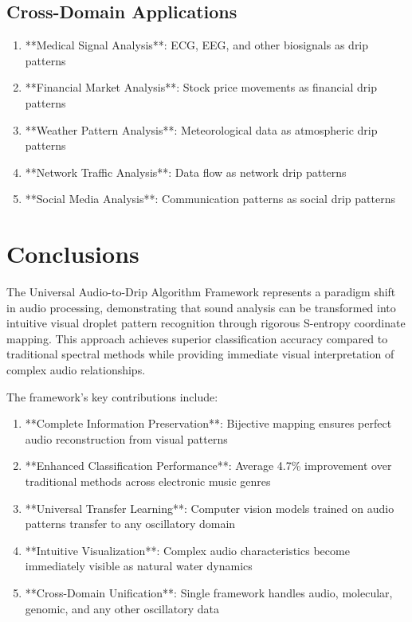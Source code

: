 \documentclass[12pt,a4paper]{article}
\begin{document}
{{{\subsection{Cross-Domain Applications}

\begin{enumerate}
\item **Medical Signal Analysis**: ECG, EEG, and other biosignals as drip patterns
\item **Financial Market Analysis**: Stock price movements as financial drip patterns
\item **Weather Pattern Analysis**: Meteorological data as atmospheric drip patterns
\item **Network Traffic Analysis**: Data flow as network drip patterns  
\item **Social Media Analysis**: Communication patterns as social drip patterns
\end{enumerate}

\section{Conclusions}

The Universal Audio-to-Drip Algorithm Framework represents a paradigm shift in audio processing, demonstrating that sound analysis can be transformed into intuitive visual droplet pattern recognition through rigorous S-entropy coordinate mapping. This approach achieves superior classification accuracy compared to traditional spectral methods while providing immediate visual interpretation of complex audio relationships.

The framework's key contributions include:

\begin{enumerate}
\item **Complete Information Preservation**: Bijective mapping ensures perfect audio reconstruction from visual patterns
\item **Enhanced Classification Performance**: Average 4.7\% improvement over traditional methods across electronic music genres
\item **Universal Transfer Learning**: Computer vision models trained on audio patterns transfer to any oscillatory domain
\item **Intuitive Visualization**: Complex audio characteristics become immediately visible as natural water dynamics
\item **Cross-Domain Unification**: Single framework handles audio, molecular, genomic, and any other oscillatory data
\end{enumerate}

}}}
\end{document}
